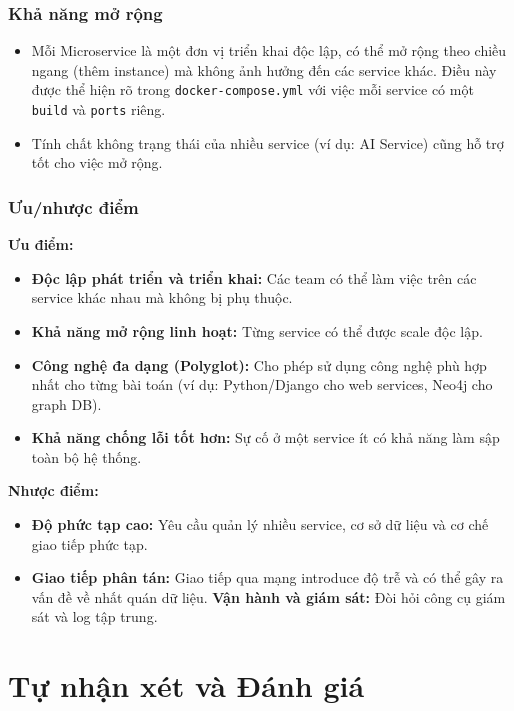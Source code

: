\documentclass[12pt,a4paper]{report}
\begin{document}
\subsection{Khả năng mở rộng}
\begin{itemize}
    \item Mỗi Microservice là một đơn vị triển khai độc lập, có thể mở rộng theo chiều ngang (thêm instance) mà không ảnh hưởng đến các service khác. Điều này được thể hiện rõ trong \texttt{docker-compose.yml} với việc mỗi service có một \texttt{build} và \texttt{ports} riêng.
    \item Tính chất không trạng thái của nhiều service (ví dụ: AI Service) cũng hỗ trợ tốt cho việc mở rộng.
\end{itemize}

\subsection{Ưu/nhược điểm}
\textbf{Ưu điểm:}
\begin{itemize}
    \item \textbf{Độc lập phát triển và triển khai:} Các team có thể làm việc trên các service khác nhau mà không bị phụ thuộc.
    \item \textbf{Khả năng mở rộng linh hoạt:} Từng service có thể được scale độc lập.
    \item \textbf{Công nghệ đa dạng (Polyglot):} Cho phép sử dụng công nghệ phù hợp nhất cho từng bài toán (ví dụ: Python/Django cho web services, Neo4j cho graph DB).
    \item \textbf{Khả năng chống lỗi tốt hơn:} Sự cố ở một service ít có khả năng làm sập toàn bộ hệ thống.
\end{itemize}
\textbf{Nhược điểm:}
\begin{itemize}
    \item \textbf{Độ phức tạp cao:} Yêu cầu quản lý nhiều service, cơ sở dữ liệu và cơ chế giao tiếp phức tạp.
    \item \textbf{Giao tiếp phân tán:} Giao tiếp qua mạng introduce độ trễ và có thể gây ra vấn đề về nhất quán dữ liệu.
    \textbf{Vận hành và giám sát:} Đòi hỏi công cụ giám sát và log tập trung.
\end{itemize}

\chapter*{Tự nhận xét và Đánh giá}
\end{document}
